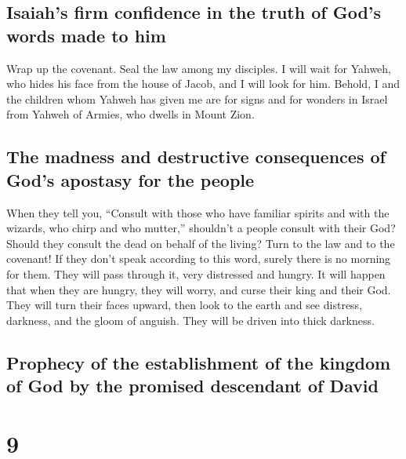 \hypertarget{isaiahs-firm-confidence-in-the-truth-of-gods-words-made-to-him}{%
\subsection{Isaiah's firm confidence in the truth of God's words made to
him}\label{isaiahs-firm-confidence-in-the-truth-of-gods-words-made-to-him}}

 Wrap up the covenant. Seal the law among my disciples.
 I will wait for Yahweh, who hides his face from the
house of Jacob, and I will look for him.  Behold, I and
the children whom Yahweh has given me are for signs and for wonders in
Israel from Yahweh of Armies, who dwells in Mount Zion.

\hypertarget{the-madness-and-destructive-consequences-of-gods-apostasy-for-the-people}{%
\subsection{The madness and destructive consequences of God's apostasy
for the
people}\label{the-madness-and-destructive-consequences-of-gods-apostasy-for-the-people}}

 When they tell you, ``Consult with those who have
familiar spirits and with the wizards, who chirp and who mutter,''
shouldn't a people consult with their God? Should they consult the dead
on behalf of the living?  Turn to the law and to the
covenant! If they don't speak according to this word, surely there is no
morning for them.  They will pass through it, very
distressed and hungry. It will happen that when they are hungry, they
will worry, and curse their king and their God. They will turn their
faces upward,  then look to the earth and see distress,
darkness, and the gloom of anguish. They will be driven into thick
darkness.

\hypertarget{prophecy-of-the-establishment-of-the-kingdom-of-god-by-the-promised-descendant-of-david}{%
\subsection{Prophecy of the establishment of the kingdom of God by the
promised descendant of
David}\label{prophecy-of-the-establishment-of-the-kingdom-of-god-by-the-promised-descendant-of-david}}

\hypertarget{section-8}{%
\section{9}\label{section-8}}

